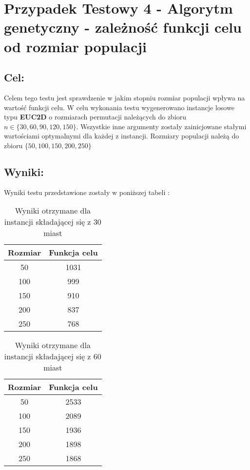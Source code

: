 \section{Przypadek Testowy 4 - Algorytm genetyczny - zależność funkcji celu od rozmiar populacji}
  \subsection{Cel:}
    Celem tego testu jest sprawdzenie w jakim stopniu rozmiar populacji wpływa na wartość funkcji celu. 
    W celu wykonania testu wygenerowano instancje losowe typu \textbf{EUC2D} o rozmiarach permutacji należących do zbioru $n \in \{30,60,90,120,150\}$.
    Wszystkie inne argumenty zostały zainicjowane stałymi wartościami optymalnymi dla każdej z instancji. Rozmiary populacji należą do zbioru $ \{50,100,150,200,250\} $
  \subsection{Wyniki: }
    Wyniki testu przedstawione zostały w poniższej tabeli :
    \begin{table}[!ht]
        \centering
        \begin{tabular}{|c | c |}
        \hline
            Rozmiar & Funkcja celu \\ \hline
            50 & 1031\\ \hline
            100 & 999\\ \hline
            150 & 910\\ \hline
            200 & 837 \\ \hline
            250 & 768\\ \hline
        \end{tabular}
        \caption{Wyniki otrzymane dla instancji składającej się z 30 miast}
    
      \end{table}
      \begin{table}[!ht]
        \centering
        \begin{tabular}{| c | c |}
        \hline
            Rozmiar & Funkcja celu  \\ \hline
            50 & 2533\\ \hline
            100 & 2089\\ \hline
            150 & 1936\\ \hline
            200 & 1898\\ \hline
            250 & 1868\\ \hline
            
        \end{tabular}
        \caption{Wyniki otrzymane dla instancji składającej się z 60 miast}
    
      \end{table}
